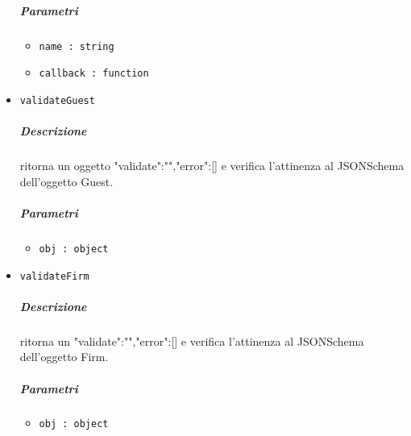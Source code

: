 \documentclass[../ManualeSviluppatore_v1.0.0.tex]{subfiles}
\begin{document}
\begin{itemize}
\subparagraph{Parametri} \begin{itemize}
\item \texttt{name : string}
\item \texttt{callback : function}
\end{itemize}
\item \texttt{validateGuest}
\subparagraph{Descrizione} ritorna un oggetto {"validate":"","error":[]} e verifica l'attinenza al JSONSchema dell'oggetto Guest.
\subparagraph{Parametri} \begin{itemize}
\item \texttt{obj : object}
\end{itemize}
\item \texttt{validateFirm}
\subparagraph{Descrizione} ritorna un {"validate":"","error":[]}  e verifica l'attinenza al JSONSchema dell'oggetto Firm.
\subparagraph{Parametri} \begin{itemize}
\item \texttt{obj : object}
\end{itemize}
\end{itemize}
\end{document}
